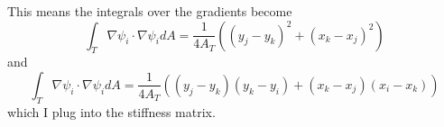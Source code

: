 This means the integrals over the gradients become
\[
    \int_T \nabla \psi_i \cdot \nabla \psi_i dA = \frac{1}{4 A_T} \left((y_j - y_k)^2 + (x_k - x_j)^2\right)
\]
and
\[
    \int_T \nabla \psi_i \cdot \nabla \psi_i dA = \frac{1}{4 A_T} \left((y_j - y_k)(y_k - y_i) + (x_k - x_j)(x_i - x_k)\right)
\]
which I plug into the stiffness matrix.
